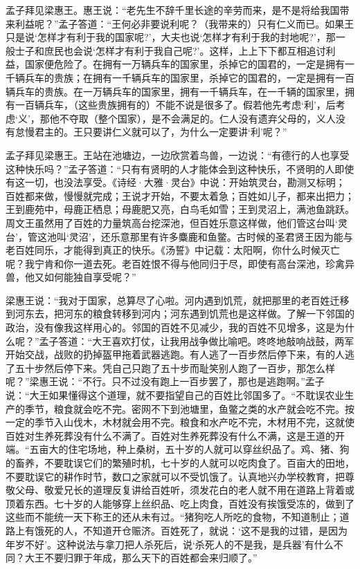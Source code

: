 \documentclass[12pt,UTF-8,openany,a4]{ctexbook}
\begin{document}
\begin{large}
    \yiwen 
    孟子拜见梁惠王。惠王说：“老先生不辞千里长途的辛劳而来，是不是将给我国带来利益呢？”孟子答道：“王何必非要说利呢？（我带来的）只有仁义而已。如果王只是说‘怎样才有利于我的国家呢?’，大夫也说‘怎样才有利于我的封地呢?’，那一般士子和庶民也会说‘怎样才有利于我自己呢?’。这样，上上下下都互相追讨利益，国家便危险了。在拥有一万辆兵车的国家里，杀掉它的国君的，一定是拥有一千辆兵车的贵族；在拥有一千辆兵车的国家里，杀掉它的国君的，一定是拥有一百辆兵车的贵族。在一万辆兵车的国家里，拥有一千辆兵车，在一千辆的国家里，拥有一百辆兵车，（这些贵族拥有的）不能不说是很多了。假若他先考虑‘利’，后考虑‘义’，那他不夺取（整个国家），是不会满足的。仁人没有遗弃父母的，义人没有怠慢君主的。王只要讲仁义就可以了，为什么一定要讲‘利’呢？”
    
    孟子拜见梁惠王。王站在池塘边，一边欣赏着鸟兽，一边说：“有德行的人也享受这种快乐吗？”孟子答道：“只有有贤明的人才能体会到这种快乐，不贤明的人即使有这一切，也没法享受。《诗经·大雅·灵台》中说：开始筑灵台，勘测又标明；百姓都来做，慢慢就完成；王说才开始，不要太着急；百姓如儿子，都来出把力；王到鹿苑中，母鹿正栖息；母鹿肥又亮，白鸟毛如雪；王到灵沼上，满池鱼跳跃。周文王虽然用了百姓的力量筑高台挖深池，但百姓乐意这样做，他们管这台叫‘灵台’，管这池叫‘灵沼’，还乐意那里有许多麋鹿和鱼鳖。古时候的圣君贤王因为能与老百姓同乐，才能得到真正的快乐。《汤誓》中记载：太阳啊，你什么时候灭亡呢？我宁肯和你一道去死。老百姓恨不得与他同归于尽，即使有高台深池，珍禽异兽，他又如何能独自享受呢？”
    
    梁惠王说：“我对于国家，总算尽了心啦。河内遇到饥荒，就把那里的老百姓迁移到河东去，把河东的粮食转移到河内；河东遇到饥荒也是这样做。了解一下邻国的政治，没有像我这样用心的。邻国的百姓不见减少，我的百姓不见增多，这是为什么呢？”孟子答道：“大王喜欢打仗，让我用战争做比喻吧。咚咚地敲响战鼓，两军开始交战，战败的扔掉盔甲拖着武器逃跑。有人逃了一百步然后停下来，有的人逃了五十步然后停下来。凭自己只跑了五十步而耻笑别人跑了一百步，那怎么样呢？”梁惠王说：“不行。只不过没有跑上一百步罢了，那也是逃跑啊。”孟子说：“大王如果懂得这个道理，就不要指望自己的百姓比邻国多了。“不耽误农业生产的季节，粮食就会吃不完。密网不下到池塘里，鱼鳖之类的水产就会吃不完。按一定的季节入山伐木，木材就会用不完。粮食和水产吃不完，木材用不完，这就使百姓对生养死葬没有什么不满了。百姓对生养死葬没有什么不满，这是王道的开端。“五亩大的住宅场地，种上桑树，五十岁的人就可以穿丝织品了。鸡、猪、狗的畜养，不要耽误它们的繁殖时机，七十岁的人就可以吃肉食了。百亩大的田地，不要耽误它的耕作时节，数口之家就可以不受饥饿了。认真地兴办学校教育，把尊敬父母、敬爱兄长的道理反复讲给百姓听，须发花白的老人就不用在道路上背着或顶着东西。七十岁的人能够穿上丝织品、吃上肉食，百姓没有挨饿受冻的，做到了这些而不能统一天下称王的还从未有过。“猪狗吃人所吃的食物，不知道制止；道路上有饿死的人，不知道开仓赈济。百姓死了，就说：‘这不是我的过错，是因为年岁不好’。这种说法与拿刀把人杀死后，说‘杀死人的不是我，是兵器’有什么不同？大王不要归罪于年成，那么天下的百姓都会来归顺了。”
    

\end{large}
\end{document}
